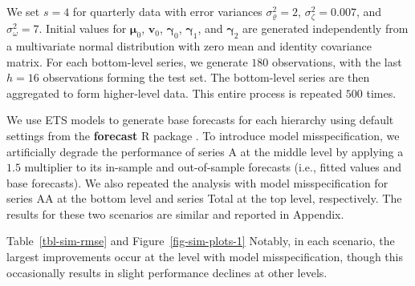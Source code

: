 \documentclass[
  11pt]{article}
\theoremstyle{plain}
\theoremstyle{remark}
\begin{document}
We set \(s = 4\) for quarterly data with error variances
\(\sigma_{\varrho}^2=2\), \(\sigma_\zeta^2=0.007\), and
\(\sigma_\omega^2=7\). Initial values for \(\bm{\mu}_0\), \(\bm{v}_0\),
\(\bm{\gamma}_0\), \(\bm{\gamma}_1\), and \(\bm{\gamma}_2\) are
generated independently from a multivariate normal distribution with
zero mean and identity covariance matrix. For each bottom-level series,
we generate \(180\) observations, with the last \(h = 16\) observations
forming the test set. The bottom-level series are then aggregated to
form higher-level data. This entire process is repeated \(500\) times.

We use ETS models to generate base forecasts for each hierarchy using
default settings from the \textbf{forecast} R package
\citep{Hyndman2023-fc}. To introduce model misspecification, we
artificially degrade the performance of series A at the middle level by
applying a \(1.5\) multiplier to its in-sample and out-of-sample
forecasts (i.e., fitted values and base forecasts). We also repeated the
analysis with model misspecification for series AA at the bottom level
and series Total at the top level, respectively. The results for these
two scenarios are similar and reported in Appendix.

Table~\ref{tbl-sim-rmse} and Figure~\ref{fig-sim-plots-1} Notably, in
each scenario, the largest improvements occur at the level with model
misspecification, though this occasionally results in slight performance
declines at other levels.
\end{document}
